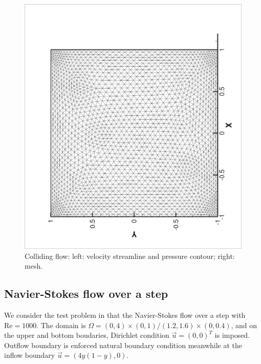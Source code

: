 \documentclass[a4paper, 11pt]{article}
\begin{document}
\begin{figure}[!htbp]
\begin{center}
\begin{minipage}{0.495\textwidth}
                \includegraphics[width = 1.0\textwidth, angle = -90]{picture/colliding_flow_data/mesh20_005.eps}
              \end{minipage} 
              \caption{\small Colliding flow: left: velocity streamline and pressure contour; right: mesh.}
              \label{fig::colliding_flow_mesh}
            \end{center}
          \end{figure}

   \subsection{Navier-Stokes flow over a step}

      We consider the test problem in \cite{zheng2010posteriori} that the
      Navier-Stokes flow over a step with $\text{Re} = 1000$. The
      domain is $\Omega = (0, 4) \times (0, 1)/(1.2, 1.6) \times (0,
      0.4)$, and on the upper and bottom boudaries, Dirichlet
      condition $\vec{u} = (0, 0)^T$ is imposed. Outflow boundary is
      enforced natural boundary condition meanwhile at the inflow
      boundary $\vec{u} = (4 y (1 - y), 0)$.
\end{document}
